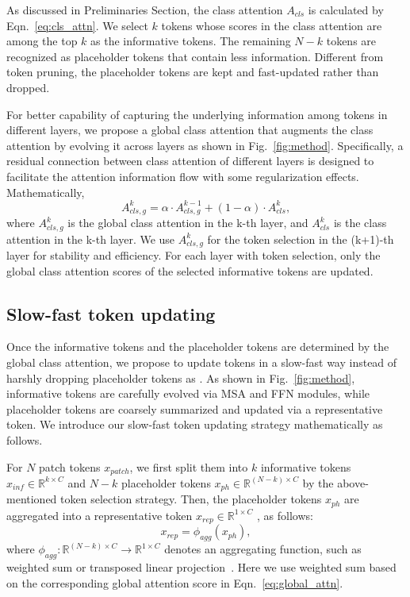 \documentclass[letterpaper]{article} \usepackage{aaai22}  \usepackage{times}  \usepackage{helvet}  \usepackage{courier}  \usepackage[hyphens]{url}  \usepackage{graphicx} \urlstyle{rm} \def\UrlFont{\rm}  \usepackage{natbib}  \usepackage{caption} \DeclareCaptionStyle{ruled}{labelfont=normalfont,labelsep=colon,strut=off} \frenchspacing  \setlength{\pdfpagewidth}{8.5in}  \setlength{\pdfpageheight}{11in}  \usepackage{algorithm}
\begin{document}
As discussed in Preliminaries Section, the class attention $A_{cls}$  is calculated by Eqn.~\ref{eq:cls_attn}. We select $k$ tokens whose scores in the class attention are among the top $k$ as the informative tokens. The remaining $N-k$ tokens are recognized as placeholder tokens that contain less information. Different from token pruning, the placeholder tokens are kept and fast-updated rather than dropped.

For better capability of capturing the underlying information among tokens in different layers, we propose a global class attention that augments the class attention by evolving it across layers as shown in Fig.~\ref{fig:method}. Specifically, a residual connection between class attention of different layers is designed to facilitate the attention information flow with some regularization effects. Mathematically, 
\begin{equation}
    A_{cls, g}^{k} = \alpha \cdot A_{cls, g}^{k-1} + (1-\alpha)\cdot A_{cls}^{k},
    \label{eq:global_attn}
\end{equation}
where $A_{cls, g}^{k}$ is the global class attention in the k-th layer, and $A_{cls}^{k}$ is the class attention in the k-th layer. We use $A_{cls, g}^{k}$ for the token selection in the (k+1)-th layer for stability and efficiency. For each layer with token selection, only the global class attention scores of the selected informative tokens are updated.



\subsection{Slow-fast token updating}
Once the informative tokens and the placeholder tokens are determined by the global class attention, we propose to update tokens in a slow-fast way instead of harshly dropping placeholder tokens as \cite{PatchSlimming,DynamicViT}. As shown in Fig.~\ref{fig:method}, informative tokens are carefully evolved via MSA and FFN modules, while placeholder tokens are coarsely summarized and updated via a representative token. 
We introduce our slow-fast token updating strategy mathematically as follows.




For $N$ patch tokens $x_{patch}$, we first split them into $k$ informative tokens $x_{inf} \in \mathbb{R}^{k \times C}$ and $N-k$ placeholder tokens $x_{ph} \in \mathbb{R}^{(N-k) \times C}$ by the above-mentioned token selection strategy. Then, the placeholder tokens $x_{ph}$ are aggregated into  a representative token $x_{rep} \in \mathbb{R}^{1 \times C}$ , as follows:
\begin{equation}
    x_{rep}=\phi_{agg}(x_{ph}), 
    \label{eq:aggregation}
\end{equation}
where $\phi_{agg}: \mathbb{R}^{(N-k) \times C} \rightarrow \mathbb{R}^{1 \times C}$ denotes an aggregating function, such as weighted sum or transposed linear projection~\cite{mlp-mixer}. Here we use weighted sum based on the corresponding global attention score in Eqn.~\ref{eq:global_attn}.
\end{document}
